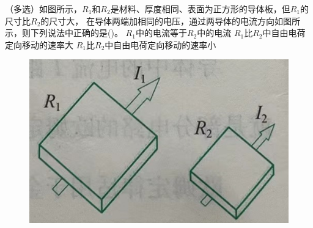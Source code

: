 \documentclass[a4paper,cs4size]{BHCexam}
\begin{document}
\begin{groups}
\begin{questions}[]
        \question[5] （多选）如图所示，$R_1$和$R_2$是材料、厚度相同、表面为正方形的导体板，但$R_1$的尺寸比$R_2$的尺寸大，
        在导体两端加相同的电压，通过两导体的电流方向如图所示，则下列说法中正确的是(\quad\quad\quad)。
        {$R_1$中的电流等于$R_2$中的电流}
        {$R_1$比$R_2$中自由电荷定向移动的速率大}
        {$R_1$比$R_2$中自由电荷定向移动的速率小}
        \begin{figure}[htb]
            \flushright
            \includegraphics [scale=0.25,trim=0 0 0 0]{./image/physics_circuit1_3.png}
            \label{fig:fig_circuit1_3}
        \end{figure}
        \vspace{2.5cm}


\end{questions}
\end{groups}
\end{document}

